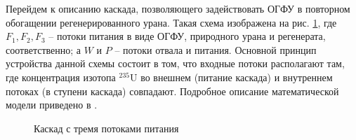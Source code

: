 
Перейдем к описанию каскада, позволяющего задействовать ОГФУ в повторном обогащении регенерированного урана.
Такая схема изображена на рис. \ref{fig:3_inputs}, где $F_{1}, F_{2}, F_{3}$ -- потоки питания в виде ОГФУ, природного урана и регенерата, соответственно; а $W$ и $P$ -- потоки отвала и питания.
Основной принцип устройства данной схемы состоит в том, что входные потоки располагают там, где концентрация изотопа $^{235}$U во внешнем (питание каскада) и внутреннем потоках (в ступени каскада) совпадают.
Подробное описание математической модели приведено в \cite{smirnovEnrichmentRegeneratedUranium2014}.

\begin{figure}[ht]
  \caption{Каскад с тремя потоками питания}\label{fig:3_inputs}
\end{figure}


